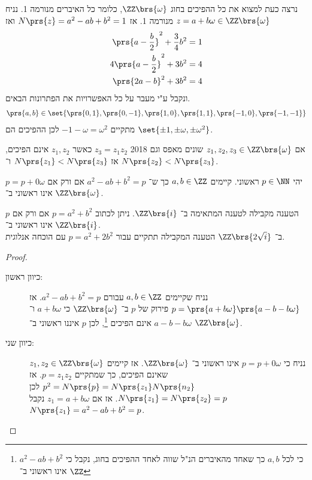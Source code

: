 \documentclass[a4paper,10pt,twoside,openany]{book}
\begin{document}
נרצה כעת למצוא את כל ההפיכים בחוג
$\ZZ\brs{\omega}$,
כלומר כל האיברים מנורמה 1.
נניח
$z = a+b\omega \in \ZZ\brs{\omega}$
מנורמה 1. אז
$N\prs{z} = a^2 - ab + b^2 = 1$
ואז
\begin{align*}
\prs{a-\frac{b}{2}}^2 + \frac{3}{4}b^2 &= 1 \\
4\prs{a-\frac{b}{2}}^2 + 3b^2 &= 4 \\
\prs{2a-b}^2 + 3b^2 &= 4
\end{align*}
ונקבל ע"י מעבר על כל האפשרויות את הפתרונות הבאים.
\begin{align*}
\prs{a,b} \in \set{\prs{0,1},\prs{0,-1}, \prs{1,0}, \prs{1,1}, \prs{-1,0}, \prs{-1,-1}}
\end{align*}
מתקיים
$-1-\omega = \omega^2$
לכן ההפיכים הם
$\set{\pm 1, \pm \omega, \pm \omega^2}$.

\begin{corollary}
אם
$z_1, z_2, z_3 \in \ZZ\brs{\omega}$
שונים מאפס וגם%
%
{2018}
$z_3 = z_1 z_2$
כאשר
$z_1, z_2$
אינם הפיכים, אז
$N\prs{z_1} < N\prs{z_3}$
ו־%
$N\prs{z_2} < N\prs{z_3}$.
\end{corollary}
\begin{proposition}
יהי
$p \in \NN$
ראשוני. קיימים
$a,b \in \ZZ$
כך ש־%
$a^2 - ab + b^2 = p$
אם ורק אם
$p = p+0\omega$
אינו ראשוני ב־%
$\ZZ\brs{\omega}$.
\end{proposition}
\begin{remark}
הטענה מקבילה לטענה המתאימה ב־%
$\ZZ\brs{i}$.
ניתן לכתוב
$p = a^2 + b^2$
אם ורק אם
$p$
אינו ראשוני ב־%
$\ZZ\brs{i}$.\\
ב־%
$\ZZ\brs{2\sqrt{i}}$
הטענה המקבילה תתקיים עבור
$p = a^2 + 2b^2$
עם הוכחה אנלוגית.
\end{remark}
\begin{proof}
\begin{description}
\item[כיוון ראשון:]
נניח שקיימים
$a,b \in \ZZ$
עבורם
$a^2 - ab + b^2 = p$.
אז
$p=\prs{a+b\omega}\prs{a-b-b\omega}$
פירוק של
$p$
ב־%
$\ZZ\brs{\omega}$
כי
$a+b\omega$
ו־%
$a-b-b\omega$
אינם הפיכים%
\footnote{כי לכל
$a,b$
כך שאחד מהאיברים הנ"ל שווה לאחד ההפיכים בחוג, נקבל כי
$a^2 - ab + b^2$
אינו ראשוני ב־%
$\ZZ$},
לכן
$p$
איננו ראשוני ב־%
$\ZZ\brs{\omega}$.
\item[כיוון שני:]
נניח כי
$p = p+0\omega$
אינו ראשוני ב־%
$\ZZ\brs{\omega}$.
אז קיימים
$z_1, z_2 \in \ZZ\brs{\omega}$
שאינם הפיכים, כך שמתקיים
$p = z_1 z_2$.
אז
$p^2 = N\prs{p} = N\prs{z_1} N\prs{n_2}$
לכן
$N\prs{z_1} = N\prs{z_2} = p$.
אז אם
$z_1 = a+b\omega$
נקבל
$N\prs{z_1} = a^2 - ab + b^2 = p$.
\end{description}
\end{proof}
\end{document}
